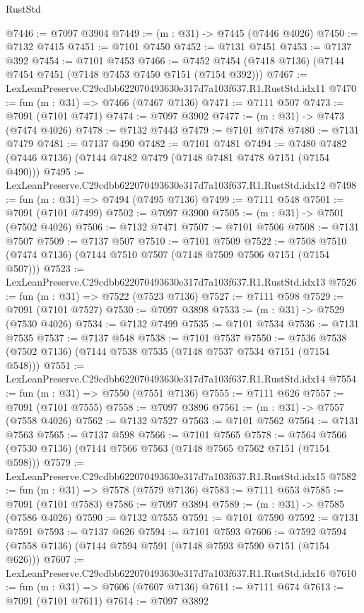 \begin{lexlean}{RustStd}
\begin{coremodule}
@7446 := @7097 @3904
@7449 := (m : @31) -> @7445 (@7446 @4026)
@7450 := @7132 @7415
@7451 := @7101 @7450
@7452 := @7131 @7451
@7453 := @7137 @392
@7454 := @7101 @7453
@7466 := @7452 @7454 (@7418 @7136) (@7144 @7454 @7451 (@7148 @7453 @7450 @7151 (@7154 @392)))
@7467 := LexLeanPreserve.C29cdbb622070493630e317d7a103f637.R1.RustStd.idx11
@7470 := fun (m : @31) => @7466 (@7467 @7136)
@7471 := @7111 @507
@7473 := @7091 (@7101 @7471)
@7474 := @7097 @3902
@7477 := (m : @31) -> @7473 (@7474 @4026)
@7478 := @7132 @7443
@7479 := @7101 @7478
@7480 := @7131 @7479
@7481 := @7137 @490
@7482 := @7101 @7481
@7494 := @7480 @7482 (@7446 @7136) (@7144 @7482 @7479 (@7148 @7481 @7478 @7151 (@7154 @490)))
@7495 := LexLeanPreserve.C29cdbb622070493630e317d7a103f637.R1.RustStd.idx12
@7498 := fun (m : @31) => @7494 (@7495 @7136)
@7499 := @7111 @548
@7501 := @7091 (@7101 @7499)
@7502 := @7097 @3900
@7505 := (m : @31) -> @7501 (@7502 @4026)
@7506 := @7132 @7471
@7507 := @7101 @7506
@7508 := @7131 @7507
@7509 := @7137 @507
@7510 := @7101 @7509
@7522 := @7508 @7510 (@7474 @7136) (@7144 @7510 @7507 (@7148 @7509 @7506 @7151 (@7154 @507)))
@7523 := LexLeanPreserve.C29cdbb622070493630e317d7a103f637.R1.RustStd.idx13
@7526 := fun (m : @31) => @7522 (@7523 @7136)
@7527 := @7111 @598
@7529 := @7091 (@7101 @7527)
@7530 := @7097 @3898
@7533 := (m : @31) -> @7529 (@7530 @4026)
@7534 := @7132 @7499
@7535 := @7101 @7534
@7536 := @7131 @7535
@7537 := @7137 @548
@7538 := @7101 @7537
@7550 := @7536 @7538 (@7502 @7136) (@7144 @7538 @7535 (@7148 @7537 @7534 @7151 (@7154 @548)))
@7551 := LexLeanPreserve.C29cdbb622070493630e317d7a103f637.R1.RustStd.idx14
@7554 := fun (m : @31) => @7550 (@7551 @7136)
@7555 := @7111 @626
@7557 := @7091 (@7101 @7555)
@7558 := @7097 @3896
@7561 := (m : @31) -> @7557 (@7558 @4026)
@7562 := @7132 @7527
@7563 := @7101 @7562
@7564 := @7131 @7563
@7565 := @7137 @598
@7566 := @7101 @7565
@7578 := @7564 @7566 (@7530 @7136) (@7144 @7566 @7563 (@7148 @7565 @7562 @7151 (@7154 @598)))
@7579 := LexLeanPreserve.C29cdbb622070493630e317d7a103f637.R1.RustStd.idx15
@7582 := fun (m : @31) => @7578 (@7579 @7136)
@7583 := @7111 @653
@7585 := @7091 (@7101 @7583)
@7586 := @7097 @3894
@7589 := (m : @31) -> @7585 (@7586 @4026)
@7590 := @7132 @7555
@7591 := @7101 @7590
@7592 := @7131 @7591
@7593 := @7137 @626
@7594 := @7101 @7593
@7606 := @7592 @7594 (@7558 @7136) (@7144 @7594 @7591 (@7148 @7593 @7590 @7151 (@7154 @626)))
@7607 := LexLeanPreserve.C29cdbb622070493630e317d7a103f637.R1.RustStd.idx16
@7610 := fun (m : @31) => @7606 (@7607 @7136)
@7611 := @7111 @674
@7613 := @7091 (@7101 @7611)
@7614 := @7097 @3892

\end{coremodule}
\end{lexlean}
